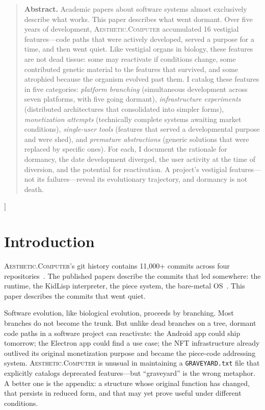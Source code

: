 \documentclass[10pt,letterpaper,twocolumn]{article}
\newcommand{\ac}{\textsc{Aesthetic.Computer}}
\begin{document}
{\begin{quote}
\small\noindent\textbf{Abstract.}
Academic papers about software systems almost exclusively describe what works. This paper describes what went dormant. Over five years of development, \ac{} accumulated 16 vestigial features---code paths that were actively developed, served a purpose for a time, and then went quiet. Like vestigial organs in biology, these features are not dead tissue: some may reactivate if conditions change, some contributed genetic material to the features that survived, and some atrophied because the organism evolved past them. I catalog these features in five categories: \emph{platform branching} (simultaneous development across seven platforms, with five going dormant), \emph{infrastructure experiments} (distributed architectures that consolidated into simpler forms), \emph{monetization attempts} (technically complete systems awaiting market conditions), \emph{single-user tools} (features that served a developmental purpose and were shed), and \emph{premature abstractions} (generic solutions that were replaced by specific ones). For each, I document the rationale for dormancy, the date development diverged, the user activity at the time of diversion, and the potential for reactivation. A project's vestigial features---not its failures---reveal its evolutionary trajectory, and dormancy is not death.
\end{quote}
\vspace{0.5em}
}]

\section{Introduction}

\ac{}'s git history contains 11,000+ commits across four repositories~\citep{scudder2026archaeology}. The published papers describe the commits that led somewhere: the runtime, the KidLisp interpreter, the piece system, the bare-metal OS~\citep{scudder2026ac, scudder2026os}. This paper describes the commits that went quiet.

Software evolution, like biological evolution, proceeds by branching. Most branches do not become the trunk. But unlike dead branches on a tree, dormant code paths in a software project can reactivate: the Android app could ship tomorrow; the Electron app could find a use case; the NFT infrastructure already outlived its original monetization purpose and became the piece-code addressing system. \ac{} is unusual in maintaining a \texttt{GRAVEYARD.txt} file that explicitly catalogs deprecated features---but ``graveyard'' is the wrong metaphor. A better one is the appendix: a structure whose original function has changed, that persists in reduced form, and that may yet prove useful under different conditions.
\end{document}
